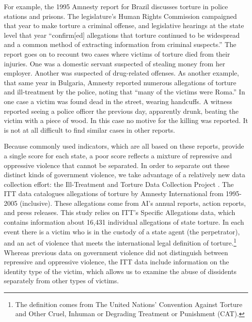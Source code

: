 \documentclass[11pt]{article}
\begin{document}
For example, the 1995 Amnesty report for Brazil discusses torture in police stations and prisons. The legislature's Human Rights Commission campaigned that year to make torture a criminal offense, and legislative hearings at the state level that year ``confirm[ed] allegations that torture continued to be widespread and a common method of extracting information from criminal suspects.'' The report goes on to recount two cases where victims of torture died from their injuries. One was a domestic servant suspected of stealing money from her employer. Another was suspected of drug-related offenses. As another example, that same year in Bulgaria, Amnesty reported numerous allegations of torture and ill-treatment by the police, noting that ``many of the victims were Roma.'' In one case a victim was found dead in the street, wearing handcuffs. A witness reported seeing a police officer the previous day, apparently drunk, beating the victim with a piece of wood. In this case no motive for the killing was reported. It is not at all difficult to find similar cases in other reports. 

Because commonly used indicators, which are all based on these reports, provide a single score for each state, a poor score reflects a mixture of repressive and oppressive violence that cannot be separated. In order to separate out these distinct kinds of government violence, we take advantage of a relatively new data collection effort: the Ill-Treatment and Torture Data Collection Project \citep{ConradHaglundMoore2014}. The ITT data catalogues allegations of torture by Amnesty International from 1995-2005 (inclusive). These allegations come from AI's annual reports, action reports, and press releases. This study relies on ITT's Specific Allegations data, which contains information about 16,431 individual allegations of state torture. In each event there is a victim who is in the custody of a state agent (the perpetrator), and an act of violence that meets the international legal definition of torture.\footnote{The definition comes from The United Nations' Convention Against Torture and Other Cruel, Inhuman or Degrading Treatment or Punishment (CAT).} Whereas previous data on government violence did not distinguish between repressive and oppressive violence, the ITT data include information on the identity type of the victim, which allows us to examine the abuse of dissidents separately from other types of victims. 
\end{document}
